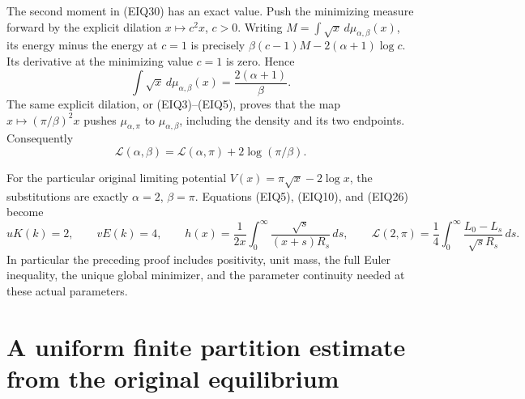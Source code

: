 \documentclass[11pt,a4paper]{article}
\begin{document}
The second moment in (EIQ30) has an exact value.  Push the minimizing
measure forward by the explicit dilation $x\mapsto c^2x$, $c>0$.
Writing $M=\int\sqrt{x}\,d\mu_{\alpha,\beta}(x)$, its energy minus
the energy at $c=1$ is precisely
$\beta(c-1)M-2(\alpha+1)\log c$.
Its derivative at the minimizing value $c=1$ is zero. Hence
\begin{equation}\tag{EIQ31}
 \int\sqrt{x}\,d\mu_{\alpha,\beta}(x)
       =\frac{2(\alpha+1)}\beta.
\end{equation}
The same explicit dilation, or (EIQ3)--(EIQ5), proves that the map
$x\mapsto(\pi/\beta)^2x$ pushes $\mu_{\alpha,\pi}$ to
$\mu_{\alpha,\beta}$, including the density and its two endpoints.
Consequently
\begin{equation}\tag{EIQ32}
 \mathcal L(\alpha,\beta)
       =\mathcal L(\alpha,\pi)+2\log(\pi/\beta).
\end{equation}

For the particular original limiting potential
$V(x)=\pi\sqrt{x}-2\log x$, the substitutions are exactly
$\alpha=2$, $\beta=\pi$. Equations (EIQ5), (EIQ10), and (EIQ26) become
\begin{equation}\tag{EIQ33}
 uK(k)=2,\qquad vE(k)=4,\qquad
 h(x)=\frac1{2x}\int_0^\infty\frac{\sqrt s}{(x+s)R_s}\,ds,
 \qquad
 \mathcal L(2,\pi)=\frac14\int_0^\infty
                         \frac{L_0-L_s}{\sqrt sR_s}\,ds.
\end{equation}
In particular the preceding proof includes positivity, unit mass,
the full Euler inequality, the unique global minimizer, and the
parameter continuity needed at these actual parameters.


\clearpage
\section{A uniform finite partition estimate from the original equilibrium}
\label{sec:QLG}
\end{document}

